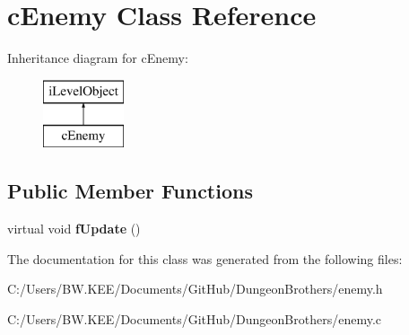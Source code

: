 \hypertarget{classc_enemy}{\section{c\-Enemy Class Reference}
\label{classc_enemy}
}
Inheritance diagram for c\-Enemy\-:\begin{figure}[H]
\begin{center}
\leavevmode
\includegraphics[height=2.000000cm]{classc_enemy}
\end{center}
\end{figure}
\subsection*{Public Member Functions}
\begin{DoxyCompactItemize}
\item 
\hypertarget{classc_enemy_a144216f8359bacaf5dd6b243d14fc0ae}{virtual void {\bfseries f\-Update} ()}\label{classc_enemy_a144216f8359bacaf5dd6b243d14fc0ae}

\end{DoxyCompactItemize}


The documentation for this class was generated from the following files\-:\begin{DoxyCompactItemize}
\item 
C\-:/\-Users/\-B\-W.\-K\-E\-E/\-Documents/\-Git\-Hub/\-Dungeon\-Brothers/enemy.\-h\item 
C\-:/\-Users/\-B\-W.\-K\-E\-E/\-Documents/\-Git\-Hub/\-Dungeon\-Brothers/enemy.\-c\end{DoxyCompactItemize}
